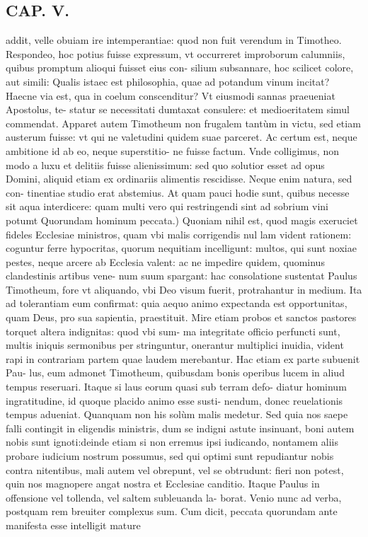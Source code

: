 \documentclass{article}
\begin{document}
\begin{pages}
\section*{CAP. V. }
\marginpar{[ p.71. ]}\pstart addit, velle obuiam ire intemperantiae: quod non fuit verendum in Timotheo. Respondeo, hoc potius fuisse expressum, vt occurreret improborum calumniis, quibus promptum alioqui fuisset eius con- silium subsannare, hoc scilicet colore, aut simili: Qualis istaec est philosophia, quae ad potandum vinum incitat? Haecne via est, qua in coelum conscenditur? Vt eiusmodi sannas praeueniat Apostolus, te- statur se necessitati dumtaxat consulere: et medioeritatem simul commendat. Apparet autem Timotheum non frugalem tantùm in victu, sed etiam austerum fuisse: vt qui ne valetudini quidem suae parceret. Ac certum est, neque ambitione id ab eo, neque superstitio- ne fuisse factum. Vnde colligimus, non modo a luxu et delitiis fuisse alienissimum: sed quo solutior esset ad opus Domini, aliquid etiam ex ordinariis alimentis rescidisse. Neque enim natura, sed con- tinentiae studio erat abstemius. At quam pauci hodie sunt, quibus necesse sit aqua interdicere: quam multi vero qui restringendi sint ad sobrium vini potumt  \pend\pstart Quorundam hominum peccata.) Quoniam nihil est, quod magis exeruciet fideles Ecclesiae ministros, quam vbi malis corrigendis nul lam vident rationem: coguntur ferre hypocritas, quorum nequitiam incelligunt: multos, qui sunt noxiae pestes, neque arcere ab Ecclesia valent: ac ne impedire quidem, quominus clandestinis artibus vene- num suum spargant: hac consolatione sustentat Paulus Timotheum, fore vt aliquando, vbi Deo visum fuerit, protrahantur in medium. Ita ad tolerantiam eum confirmat: quia aequo animo expectanda est opportunitas, quam Deus, pro sua sapientia, praestituit. Mire etiam probos et sanctos pastores torquet altera indignitas: quod vbi sum- ma integritate officio perfuncti sunt, multis iniquis sermonibus per stringuntur, onerantur multiplici inuidia, vident rapi in contrariam partem quae laudem merebantur. Hac etiam ex parte subuenit Pau- lus, eum admonet Timotheum, quibusdam bonis operibus lucem in aliud tempus reseruari. Itaque si laus eorum quasi sub terram defo- diatur hominum ingratitudine, id quoque placido animo esse susti- nendum, donec reuelationis tempus adueniat. Quanquam non his solùm malis medetur. Sed quia nos saepe falli contingit in eligendis ministris, dum se indigni astute insinuant, boni autem nobis sunt ignoti:deinde etiam si non erremus ipsi iudicando, nontamem aliis probare iudicium nostrum possumus, sed qui optimi sunt repudiantur nobis contra nitentibus, mali autem vel obrepunt, vel se obtrudunt: fieri non potest, quin nos magnopere angat nostra et Ecclesiae canditio. Itaque Paulus in offensione vel tollenda, vel saltem subleuanda la- borat. Venio nunc ad verba, postquam rem breuiter complexus sum. Cum dicit, peccata quorundam ante manifesta esse intelligit mature  \pend

\end{pages}
\end{document}

